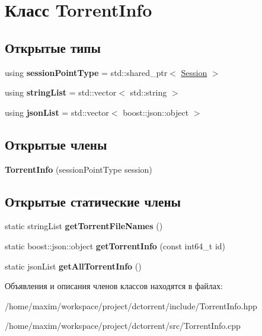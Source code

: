 \hypertarget{class_torrent_info}{}\section{Класс Torrent\+Info}
\label{class_torrent_info}
\subsection*{Открытые типы}
\begin{DoxyCompactItemize}
\item 
\mbox{\label{class_torrent_info_a48ea7d5033a3cbe98af5c335dc1a4747}} 
using {\bfseries session\+Point\+Type} = std\+::shared\+\_\+ptr$<$ \hyperlink{class_session}{Session} $>$
\item 
\mbox{\label{class_torrent_info_a61cc54f994d201a10eeec77d5bca88bb}} 
using {\bfseries string\+List} = std\+::vector$<$ std\+::string $>$
\item 
\mbox{\label{class_torrent_info_aa50ef897a74c15383ca2be3b7e7cc84f}} 
using {\bfseries json\+List} = std\+::vector$<$ boost\+::json\+::object $>$
\end{DoxyCompactItemize}
\subsection*{Открытые члены}
\begin{DoxyCompactItemize}
\item 
\mbox{\label{class_torrent_info_ad1951d38efaed083fa99acb1791ebeb5}} 
{\bfseries Torrent\+Info} (session\+Point\+Type session)
\end{DoxyCompactItemize}
\subsection*{Открытые статические члены}
\begin{DoxyCompactItemize}
\item 
\mbox{\label{class_torrent_info_a2e780e998c0056fcd9cb5fe487a5fe82}} 
static string\+List {\bfseries get\+Torrent\+File\+Names} ()
\item 
\mbox{\label{class_torrent_info_a044027a0abb8666449b8f5b839649242}} 
static boost\+::json\+::object {\bfseries get\+Torrent\+Info} (const int64\+\_\+t id)
\item 
\mbox{\label{class_torrent_info_a83bfa2e026eddc44ae747aaf312b8d6a}} 
static json\+List {\bfseries get\+All\+Torrent\+Info} ()
\end{DoxyCompactItemize}


Объявления и описания членов классов находятся в файлах\+:\begin{DoxyCompactItemize}
\item 
/home/maxim/workspace/project/dctorrent/include/Torrent\+Info.\+hpp\item 
/home/maxim/workspace/project/dctorrent/src/Torrent\+Info.\+cpp\end{DoxyCompactItemize}
